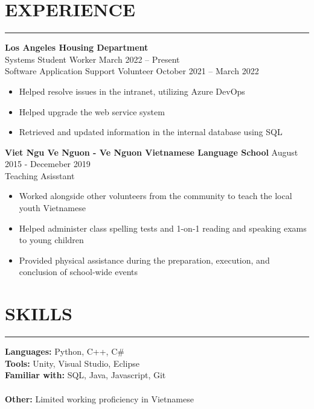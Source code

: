 \documentclass{article}
\begin{document}
\section*{EXPERIENCE} \vspace{-6pt} \hrule \vspace{6pt}
\textbf{Los Angeles Housing Department}\\
Systems Student Worker \hfill March 2022 -- Present\\
Software Application Support Volunteer \hfill October 2021 -- March 2022
\begin{itemize}
	\item\vspace{-6pt} Helped resolve issues in the intranet, utilizing Azure DevOps
	\item\vspace{-6pt} Helped upgrade the web service system
	\item\vspace{-6pt} Retrieved and updated information in the internal database using SQL
\end{itemize}
\vspace{-6pt}
\textbf{Viet Ngu Ve Nguon - Ve Nguon Vietnamese Language School} \hfill August 2015 - Decemeber 2019\\
Teaching Asisstant
\begin{itemize}
	\item\vspace{-6pt} Worked alongside other volunteers from the community to teach the local youth Vietnamese
	\item\vspace{-6pt} Helped administer class spelling tests and 1-on-1 reading and speaking exams to young children
	\item\vspace{-6pt} Provided physical assistance during the preparation, execution, and conclusion of school-wide events
\end{itemize}
\vspace{-20pt}

\section*{SKILLS} \vspace{-6pt} \hrule \vspace{6pt}
\textbf{Languages:} Python, C++, C$\#$ \\
\textbf{Tools:} Unity, Visual Studio, Eclipse\\
\textbf{Familiar with:} SQL, Java, Javascript, Git \\\vspace{-6pt}\\
\textbf{Other:} Limited working proficiency in Vietnamese
\vspace{-10pt}
\end{document}
